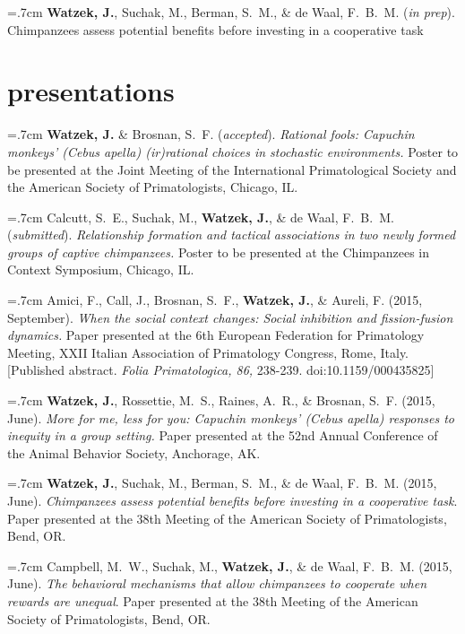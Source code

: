 \documentclass[]{friggeri-cv}
\begin{document}
\hangindent=.7cm \textbf{Watzek, J.}, Suchak, M., Berman, S.~M., \& de Waal, F.~B.~M. (\emph{in prep}). Chimpanzees assess potential benefits before investing in a cooperative task\\[-.1cm]



\section{presentations}

\hangindent=.7cm \textbf{Watzek, J.} \& Brosnan, S.~F. (\emph{accepted}). \emph{Rational fools: Capuchin monkeys' \emph{(Cebus apella)} (ir)rational choices in stochastic environments.} Poster to be presented at the Joint Meeting of the International Primatological Society and the American Society of Primatologists, Chicago, IL.

\hangindent=.7cm Calcutt, S.~E., Suchak, M., \textbf{Watzek, J.}, \& de Waal, F.~B.~M. (\emph{submitted}). \emph{Relationship formation and tactical associations in two newly formed groups of captive chimpanzees.} Poster to be presented at the Chimpanzees in Context Symposium, Chicago, IL.

\hangindent=.7cm Amici, F., Call, J., Brosnan, S.~F., \textbf{Watzek, J.}, \& Aureli, F. (2015, September). \emph{When the social context changes: Social inhibition and fission-fusion dynamics.} Paper presented at the 6th European Federation for Primatology Meeting, XXII Italian Association of Primatology Congress, Rome, Italy. [Published abstract. \emph{Folia Primatologica, 86,} 238-239. doi:10.1159/000435825]

\hangindent=.7cm \textbf{Watzek, J.}, Rossettie, M.~S., Raines, A.~R., \& Brosnan, S.~F. (2015, June). \emph{More for me, less for you: Capuchin monkeys' (\emph{Cebus apella}) responses to inequity in a group setting.} Paper presented at the 52nd Annual Conference of the Animal Behavior Society, Anchorage, AK.

\hangindent=.7cm \textbf{Watzek, J.}, Suchak, M., Berman, S.~M., \& de Waal, F.~B.~M. (2015, June). \emph{Chimpanzees assess potential benefits before investing in a cooperative task}. Paper presented at the 38th Meeting of the American Society of Primatologists, Bend, OR.

\hangindent=.7cm Campbell, M.~W., Suchak, M., \textbf{Watzek, J.}, \& de Waal, F.~B.~M. (2015, June). \emph{The behavioral mechanisms that allow chimpanzees to cooperate when rewards are unequal}. Paper presented at the 38th Meeting of the American Society of Primatologists, Bend, OR.
\end{document}
